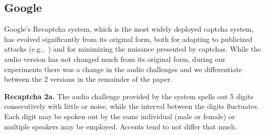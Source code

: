 \subsection{Google \re}

Google's Recaptcha system, which is the most widely deployed captcha system,
has evolved significantly from its original form, both for adapting to publicized 
attacks (e.g.,~\cite{GoodfellowBIAS13}) and for minimizing the nuisance 
presented by captchas. While the audio version has not changed much from its original 
form, during our experiments there was a change in the audio challenges and we 
differentiate between the 2 versions in the remainder of the paper. 


\textbf{Recaptcha 2a.} The audio challenge provided by the \re system spells out 5 digits
consecutively with little or noise, while the interval between the digits fluctuates. 
Each digit may be spoken out by the same individual (male or female) or multiple 
speakers may be employed. Accents tend to not differ that much.

%

